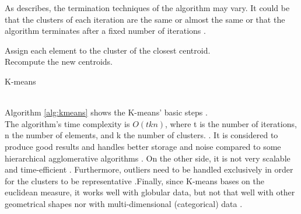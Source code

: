 As \textcite{dunham} describes, the termination techniques of the algorithm may vary. It could be that the clusters of each iteration are the same or almost the same or that the algorithm terminates after a fixed number of iterations \autocite[140]{dunham}.
\begin{algorithm}
\SetAlgoLined
{}
{
Assign each element to the cluster of the closest centroid.\\
Recompute the new centroids.
}
\caption{K-means}\label{alg:kmeans}
\end{algorithm} \\
Algorithm \ref{alg:kmeans} shows the K-means' basic steps \autocite{dunham, tanSteinKum}. \\
The algorithm's time complexity is \(O(tkn)\), where t is the number of iterations, n the number of elements, and k the number of clusters. \autocite[141]{dunham}. It is considered to produce good results and handles better storage and noise compared to some hierarchical agglomerative algorithms \autocite[526]{tanSteinKum}. On the other side, it is not very scalable and time-efficient \autocite[141]{dunham}. Furthermore, outliers need to be handled exclusively in order for the clusters to be representative \autocite[506]{tanSteinKum}.Finally, since K-means bases on the euclidean measure, it works well with globular data, but not that well with other geometrical shapes nor with multi-dimensional (categorical) data \autocite[647, 649]{survey}.

